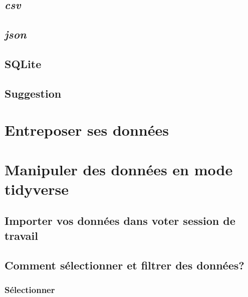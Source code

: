 \documentclass[]{book}
\begin{document}
\hypertarget{csv}{%
\subsection{\texorpdfstring{\emph{csv}}{csv}}\label{csv}}

\hypertarget{json}{%
\subsection{\texorpdfstring{\emph{json}}{json}}\label{json}}

\hypertarget{sqlite}{%
\subsection{SQLite}\label{sqlite}}

\hypertarget{suggestion}{%
\subsection{Suggestion}\label{suggestion}}

\hypertarget{entreposer-ses-donnuxe9es}{%
\section{Entreposer ses données}\label{entreposer-ses-donnuxe9es}}

\hypertarget{manipuler-des-donnuxe9es-en-mode-tidyverse}{%
\section{Manipuler des données en mode
tidyverse}\label{manipuler-des-donnuxe9es-en-mode-tidyverse}}

\hypertarget{importer-vos-donnuxe9es-dans-voter-session-de-travail}{%
\subsection{Importer vos données dans voter session de
travail}\label{importer-vos-donnuxe9es-dans-voter-session-de-travail}}

\hypertarget{comment-suxe9lectionner-et-filtrer-des-donnuxe9es}{%
\subsection{Comment sélectionner et filtrer des
données?}\label{comment-suxe9lectionner-et-filtrer-des-donnuxe9es}}

\hypertarget{suxe9lectionner}{%
\subsubsection{Sélectionner}\label{suxe9lectionner}}
\end{document}
